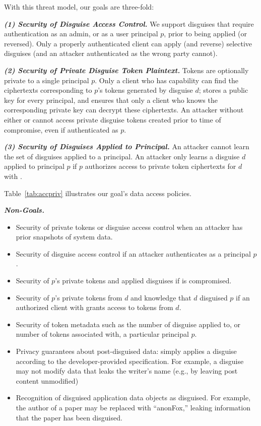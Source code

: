 With this threat model, our goals are three-fold: 

\vspace{6pt}\noindent\textbf{\emph{(1) Security of Disguise Access Control.}}
We support disguises that require authentication as an admin, or as a user principal $p$, prior to being applied (or
reversed). Only a properly authenticated client can apply (and reverse) selective disguises
(and an attacker authenticated as the wrong party cannot).

\vspace{6pt}\noindent\textbf{\emph{(2) Security of Private Disguise Token Plaintext.}}
Tokens are optionally private to a single principal $p$. 
Only a client who has capability 
can find the ciphertexts corresponding to $p$'s tokens generated by disguise $d$; 
\sys stores a public key  for every principal, and ensures that 
only a client who knows the corresponding private key  
can decrypt these ciphertexts.
%
An attacker without either  or  cannot access private disguise tokens created prior to time of compromise, even if authenticated as $p$.

\vspace{6pt}\noindent\textbf{\emph{(3) Security of Disguises Applied to Principal.}}
An attacker cannot learn the set of disguises applied to a principal. An attacker only learns a
disguise $d$ applied to principal $p$ if $p$ authorizes access to private token ciphertexts for $d$ with
.

\vspace{6pt}\noindent
Table~\ref{tab:accpriv} illustrates our goal's data access policies.

\vspace{6pt}\noindent\textbf{\emph{Non-Goals.}}
\begin{itemize}
    \item Security of private tokens or disguise access control when an attacker has prior snapshots of system data.
    \item Security of disguise access control if an attacker authenticates as a principal $p$.
    \item Security of $p$'s private tokens and applied disguises if  is compromised.  
    \item Security of $p$'s private tokens from $d$ and knowledge that $d$ disguised $p$ if an authorized client with  grants \sys access to tokens from $d$. 
    \item Security of token metadata such as the number of disguise applied to, or number of tokens associated with, a particular principal $p$.
    \item Privacy guarantees about post-disguised data: \sys simply
        applies a disguise according to the developer-provided specification.  For example, a
        disguise may not modify data that leaks the writer's name (e.g., by leaving post content
        unmodified)
    \item Recognition of disguised application data objects as disguised. For example, the author of a
        paper may be replaced with ``anonFox,'' leaking information that the paper has been
        disguised.
\end{itemize}
